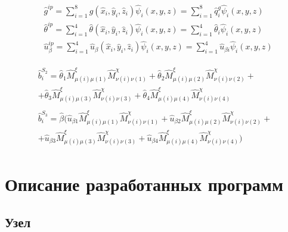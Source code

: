 \documentclass[12pt, a4paper]{article}
\begin{document}
\begin{align}
  &\hat{g}^{ip} 
    = \sum_{i=1}^{8}
        g(\hat{x}_i, \hat{y}_i, \hat{z}_i)\hat{\psi}_i(x, y, z)
    = \sum_{i=1}^{8}
        \hat{q}_{i}^{g}\hat{\psi}_i(x, y, z) \\
  &\hat{\theta}^{ip} 
    = \sum_{i=1}^{4}
        \hat{\theta}(\hat{x}_i, \hat{y}_i, \hat{z}_i)\hat{\psi}_i(x, y, z)
    = \sum_{i=1}^{4}
        \hat{\theta}_{i}\hat{\psi}_i(x, y, z) \\
  &\hat{u}_{\beta}^{ip} 
    = \sum_{i=1}^{4}
        \hat{u}_{\beta}(\hat{x}_i, \hat{y}_i, \hat{z}_i)\hat{\psi}_i(x, y, z)
    = \sum_{i=1}^{4}
        \hat{u}_{\beta i}\hat{\psi}_i(x, y, z)
\end{align}

\begin{align}
  \begin{split}
    \hat{b}_i^{S_2} 
      = \hat{\theta}_1 \hat{M}_{\mu(i)\mu(1)}^{\xi} \hat{M}_{\nu(i)\nu(1)}^{\chi} + 
        \hat{\theta}_2 \hat{M}_{\mu(i)\mu(2)}^{\xi} \hat{M}_{\nu(i)\nu(2)}^{\chi} + \\
      + \hat{\theta}_3 \hat{M}_{\mu(i)\mu(3)}^{\xi} \hat{M}_{\nu(i)\nu(3)}^{\chi} +
        \hat{\theta}_4 \hat{M}_{\mu(i)\mu(4)}^{\xi} \hat{M}_{\nu(i)\nu(4)}^{\chi}
  \end{split} \\[1ex]
  \begin{split}
    \hat{b}_i^{S_3} 
      = \hat{\beta}(
        \hat{u}_{\beta 1} \hat{M}_{\mu(i)\mu(1)}^{\xi} \hat{M}_{\nu(i)\nu(1)}^{\chi} + 
        \hat{u}_{\beta 2} \hat{M}_{\mu(i)\mu(2)}^{\xi} \hat{M}_{\nu(i)\nu(2)}^{\chi} + \\
      + \hat{u}_{\beta 3} \hat{M}_{\mu(i)\mu(3)}^{\xi} \hat{M}_{\nu(i)\nu(3)}^{\chi} +
        \hat{u}_{\beta 4} \hat{M}_{\mu(i)\mu(4)}^{\xi} \hat{M}_{\nu(i)\nu(4)}^{\chi}
      )
  \end{split}
\end{align}

\section{Описание разработанных программ}
\subsection{Узел}

\inputminted[firstline=4, lastline=20]{c}{/home/mehandes/c/src/github.com/meha4j/math/pde/fem/sse/include/fem/sse/vtx.h}
\end{document}

